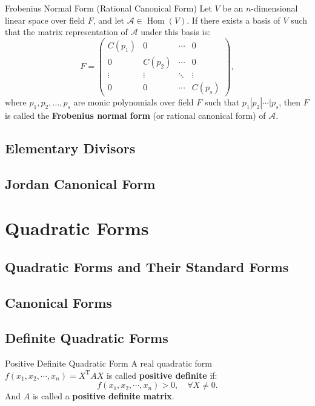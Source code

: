 \documentclass[11pt]{../../TexTemplate/elegantbook} %
\begin{document}
\begin{definition}{Frobenius Normal Form (Rational Canonical Form)}
    Let \( V \) be an \( n \)-dimensional linear space over field \( F \),
    and let \( \mathcal{A}\in \operatorname{Hom}(V) \).
    If there exists a basis of \( V \) such that the matrix representation of \( \mathcal{A} \) under this basis is:
    \[
    F = 
    \begin{pmatrix}
        C(p_1) & 0 & \cdots & 0 \\
        0 & C(p_2) & \cdots & 0 \\
        \vdots & \vdots & \ddots & \vdots \\
        0 & 0 & \cdots & C(p_s)
    \end{pmatrix},
    \]
    where \( p_1, p_2, \dots, p_s \) are monic polynomials over field \( F \) such that
    \( p_1 | p_2 | \cdots | p_s \),
    then \( F \) is called the \textbf{Frobenius normal form} (or rational canonical form) of \( \mathcal{A} \).
\end{definition}


\section{Elementary Divisors}

\section{Jordan Canonical Form}

\chapter{Quadratic Forms}
\section{Quadratic Forms and Their Standard Forms}
\section{Canonical Forms}
\section{Definite Quadratic Forms}
\begin{definition}{Positive Definite Quadratic Form}
    A real quadratic form \( f( x_{1}, x_{2}, \cdots, x_{n})=X^{\mathrm{T}}AX \) is called \textbf{positive definite} if:
    \[
    f( x_{1}, x_{2}, \cdots, x_{n}) > 0, \quad \forall X \neq 0.
    \]
    And \( A \) is called a \textbf{positive definite matrix}.
\end{definition}
\end{document}
